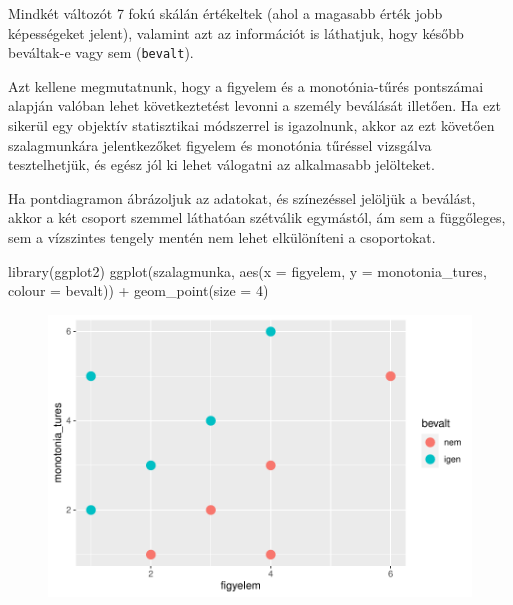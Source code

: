 \documentclass[
  letterpaper,
]{krantz}
\makeatletter
\newenvironment{Shaded}{\begin{snugshade}}{\end{snugshade}}
\newcommand{\AttributeTok}[1]{\textcolor[rgb]{0.40,0.45,0.13}{#1}}
\newcommand{\DecValTok}[1]{\textcolor[rgb]{0.68,0.00,0.00}{#1}}
\newcommand{\FunctionTok}[1]{\textcolor[rgb]{0.28,0.35,0.67}{#1}}
\newcommand{\NormalTok}[1]{\textcolor[rgb]{0.00,0.23,0.31}{#1}}
\newcommand{\SpecialCharTok}[1]{\textcolor[rgb]{0.37,0.37,0.37}{#1}}
\newenvironment{kframe}{%
\medskip{}
\setlength{\fboxsep}{.8em}
 \def\at@end@of@kframe{}%
 \ifinner\ifhmode%
  \def\at@end@of@kframe{\end{minipage}}%
  \begin{minipage}{\columnwidth}%
 \fi\fi%
 \def\FrameCommand##1{\hskip\@totalleftmargin \hskip-\fboxsep
 \colorbox{shadecolor}{##1}\hskip-\fboxsep
     \hskip-\linewidth \hskip-\@totalleftmargin \hskip\columnwidth}%
 \MakeFramed {\advance\hsize-\width
   \@totalleftmargin\z@ \linewidth\hsize
   \@setminipage}}%
 {\par\unskip\endMakeFramed%
 \at@end@of@kframe}
\renewenvironment{Shaded}{\begin{kframe}}{\end{kframe}}
\makeatother
\begin{document}
Mindkét változót 7 fokú skálán értékeltek (ahol a magasabb érték jobb
képességeket jelent), valamint azt az információt is láthatjuk, hogy
később beváltak-e vagy sem (\texttt{bevalt}).

Azt kellene megmutatnunk, hogy a figyelem és a monotónia-tűrés
pontszámai alapján valóban lehet következtetést levonni a személy
beválását illetően. Ha ezt sikerül egy objektív statisztikai módszerrel
is igazolnunk, akkor az ezt követően szalagmunkára jelentkezőket
figyelem és monotónia tűréssel vizsgálva tesztelhetjük, és egész jól ki
lehet válogatni az alkalmasabb jelölteket.

Ha pontdiagramon ábrázoljuk az adatokat, és színezéssel jelöljük a
beválást, akkor a két csoport szemmel láthatóan szétválik egymástól, ám
sem a függőleges, sem a vízszintes tengely mentén nem lehet elkülöníteni
a csoportokat.

\begin{Shaded}
\begin{Highlighting}[]
\FunctionTok{library}\NormalTok{(ggplot2)}
\FunctionTok{ggplot}\NormalTok{(szalagmunka, }\FunctionTok{aes}\NormalTok{(}\AttributeTok{x =}\NormalTok{ figyelem, }\AttributeTok{y =}\NormalTok{ monotonia\_tures, }\AttributeTok{colour =}\NormalTok{ bevalt)) }\SpecialCharTok{+}
    \FunctionTok{geom\_point}\NormalTok{(}\AttributeTok{size =} \DecValTok{4}\NormalTok{)}
\end{Highlighting}
\end{Shaded}

\begin{figure}[H]

{\centering \includegraphics{./sec_diszkrimninancia_files/figure-pdf/unnamed-chunk-3-1.pdf}

}

\end{figure}
\end{document}
